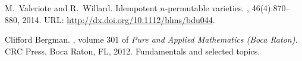 \begin{thebibliography}{1}
  M.~Valeriote and R.~Willard.
  \newblock Idempotent {$n$}-permutable varieties.
  , 46(4):870--880, 2014.
  \newblock URL: \url{http://dx.doi.org/10.1112/blms/bdu044}.%

Clifford Bergman.
, volume 301 of {\em Pure and Applied
  Mathematics (Boca Raton)}.
\newblock CRC Press, Boca Raton, FL, 2012.
\newblock Fundamentals and selected topics.


\end{thebibliography}







